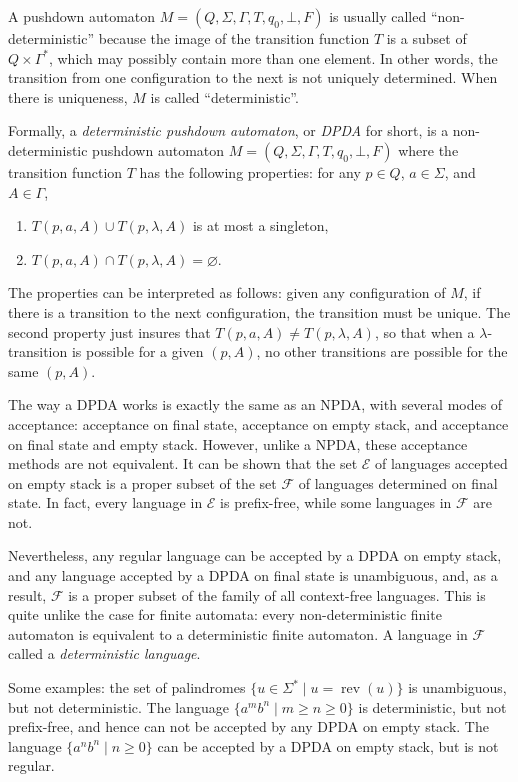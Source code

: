 \documentclass[12pt]{article}
\begin{document}
A pushdown automaton $M=(Q,\Sigma,\Gamma,T,q_0,\bot,F)$ is usually called ``non-deterministic'' because the image of the transition function $T$ is a subset of $Q\times \Gamma^*$, which may possibly contain more than one element.  In other words, the transition from one configuration to the next is not uniquely determined.  When there is uniqueness, $M$ is called ``deterministic''.

Formally, a \emph{deterministic pushdown automaton}, or \emph{DPDA} for short, is a non-deterministic pushdown automaton $M=(Q,\Sigma,\Gamma,T,q_0,\bot,F)$ where the transition function $T$ has the following properties: for any $p\in Q$, $a\in \Sigma$, and $A\in \Gamma$,
\begin{enumerate}
\item $T(p,a,A)\cup T(p,\lambda,A)$ is at most a singleton,
\item $T(p,a,A)\cap T(p,\lambda,A)=\varnothing$.
\end{enumerate}
The properties can be interpreted as follows: given any configuration of $M$, if there is a transition to the next configuration, the transition must be unique.  The second property just insures that $T(p,a,A)\ne T(p,\lambda,A)$, so that when a $\lambda$-transition is possible for a given $(p,A)$, no other transitions are possible for the same $(p,A)$.

The way a DPDA works is exactly the same as an NPDA, with several modes of acceptance: acceptance on final state, acceptance on empty stack, and acceptance on final state and empty stack.  However, unlike a NPDA, these acceptance methods are not equivalent.  It can be shown that the set $\mathscr{E}$ of languages accepted on empty stack is a proper subset of the set $\mathscr{F}$ of languages determined on final state.  In fact, every language in $\mathscr{E}$ is prefix-free, while some languages in $\mathscr{F}$ are not.

Nevertheless, any regular language can be accepted by a DPDA on empty stack, and any language accepted by a DPDA on final state is unambiguous, and, as a result, $\mathscr{F}$ is a proper subset of the family of all context-free languages.  This is quite unlike the case for finite automata: every non-deterministic finite automaton is equivalent to a deterministic finite automaton.  A language in $\mathscr{F}$ called a \emph{deterministic language}.

Some examples: the set of palindromes $\lbrace u \in \Sigma^* \mid u = \operatorname{rev}(u) \rbrace$ is unambiguous, but not deterministic.  The language $\lbrace a^m b^n \mid m \ge n \ge 0 \rbrace$ is deterministic, but not prefix-free, and hence can not be accepted by any DPDA on empty stack.  The language $\lbrace a^n b^n \mid n\ge 0 \rbrace$ can be accepted by a DPDA on empty stack, but is not regular.
\end{document}
